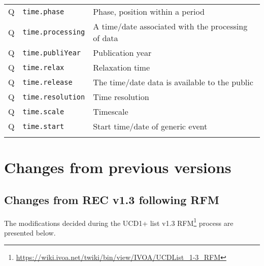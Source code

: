 \documentclass[11pt,a4paper]{ivoa}
\begin{document}
\begin{longtable}[h!]{c|p{40ex}|p{}}
Q & {\tt time.phase} & Phase, position within a period\\
Q & {\tt time.processing} & A time/date associated with the processing of data\\
Q & {\tt time.publiYear} & Publication year\\
Q & {\tt time.relax} & Relaxation time\\
Q & {\tt time.release} & The time/date data is available to the public\\
Q & {\tt time.resolution} & Time resolution\\
Q & {\tt time.scale} & Timescale\\
Q & {\tt time.start} & Start time/date of generic event\\

\sptablerule
\label{table:ucd-list}
\end{longtable}

\section{Changes from previous versions}

\subsection{Changes from REC v1.3 following RFM}

The modifications decided during the UCD1+ list v1.3 
RFM\footnote{\url{https://wiki.ivoa.net/twiki/bin/view/IVOA/UCDList_1-3_RFM}} process are presented below.

\end{document}
